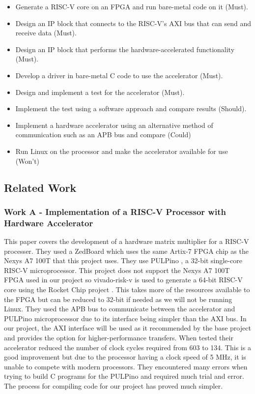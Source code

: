\begin{itemize}
	\item Generate a RISC-V core on an FPGA and run bare-metal code on it (Must).
	\item Design an IP block that connects to the RISC-V's AXI bus that can send and receive data (Must).
	\item Design an IP block that performs the hardware-accelerated functionality (Must).
	\item Develop a driver in bare-metal C code to use the accelerator (Must).
	\item Design and implement a test for the accelerator (Must).
	\item Implement the test using a software approach and compare results (Should).
	\item Implement a hardware accelerator using an alternative method of communication such as an APB bus and compare (Could)
	\item Run Linux on the processor and make the accelerator available for use (Won't)
\end{itemize}

\newpage

\subsection{Related Work}
\subsubsection{Work A - Implementation of a RISC-V Processor with Hardware Accelerator \cite{risc-v_hard_accel}}
This paper covers the development of a hardware matrix multiplier for a RISC-V processer. They used a ZedBoard which uses the same Artix-7 FPGA chip as the Nexys A7 100T that this project uses. They use PULPino \cite{pulpino}, a 32-bit single-core RISC-V microprocessor. This project does not support the Nexys A7 100T FPGA used in our project so vivado-risk-v \cite{vivado-risk-v} is used to generate a 64-bit RISC-V core using the Rocket Chip project \cite{rocketchip}. This takes more of the resources available to the FPGA but can be reduced to 32-bit if needed as we will not be running Linux. They used the APB bus to communicate between the accelerator and PULPino microprocessor due to its interface being simpler than the AXI bus. In our project, the AXI interface will be used as it recommended by the base project and provides the option for higher-performance transfers. When tested their accelerator reduced the number of clock cycles required from 603 to 134. This is a good improvement but due to the processor having a clock speed of 5 MHz, it is unable to compete with modern processors. They encountered many errors when trying to build C programs for the PULPino and required much trial and error. The process for compiling code for our project has proved much simpler.

